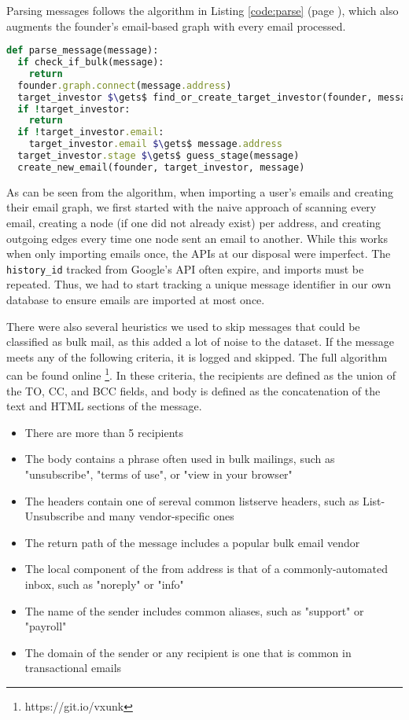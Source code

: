 Parsing messages follows the algorithm in Listing \ref{code:parse} (page \pageref{code:parse}), which also augments the founder's email-based graph with every email processed.

\begin{lstlisting}[float,frame=single,mathescape=true,language=Ruby,basicstyle=\footnotesize,columns=fullflexible,caption={Parse Message},label={code:parse}]
def parse_message(message):
  if check_if_bulk(message):
    return
  founder.graph.connect(message.address)
  target_investor $\gets$ find_or_create_target_investor(founder, message)
  if !target_investor:
    return
  if !target_investor.email:
    target_investor.email $\gets$ message.address
  target_investor.stage $\gets$ guess_stage(message)
  create_new_email(founder, target_investor, message)
\end{lstlisting}

As can be seen from the algorithm, when importing a user's emails and creating their email graph, we first started with the naive approach of scanning every email, creating a node (if one did not already exist) per address, and creating outgoing edges every time one node sent an email to another. While this works when only importing emails once, the APIs at our disposal were imperfect. The \texttt{history\_id} tracked from Google's API often expire, and imports must be repeated. Thus, we had to start tracking a unique message identifier in our own database to ensure emails are imported at most once.

There were also several heuristics we used to skip messages that could be classified as bulk mail, as this added a lot of noise to the dataset. If the message meets any of the following criteria, it is logged and skipped. The full algorithm can be found online \footnote{https://git.io/vxunk}. In these criteria, the recipients are defined as the union of the TO, CC, and BCC fields, and body is defined as the concatenation of the text and HTML sections of the message.

\begin{itemize}
  \item There are more than 5 recipients
  \item The body contains a phrase often used in bulk mailings, such as "unsubscribe", "terms of use", or "view in your browser"
  \item The headers contain one of sereval common listserve headers, such as List-Unsubscribe and many vendor-specific ones
  \item The return path of the message includes a popular bulk email vendor
  \item The local component of the from address is that of a commonly-automated inbox, such as "noreply" or "info"
  \item The name of the sender includes common aliases, such as "support" or "payroll"
  \item The domain of the sender or any recipient is one that is common in transactional emails
\end{itemize}

